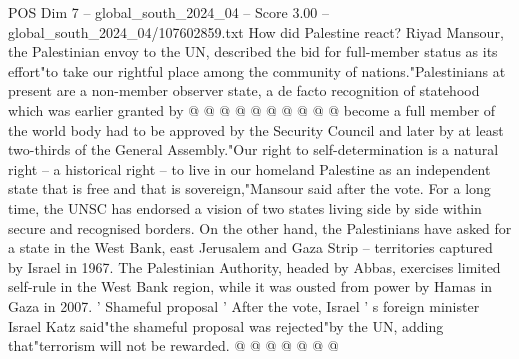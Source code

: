 \begin{textsample}{POS Dim 7 – global\_south\_2024\_04 – Score 3.00 – global\_south\_2024\_04/107602859.txt}
How did Palestine react?
Riyad Mansour, the Palestinian envoy to the UN, described the bid for full-member status as its effort"to take our rightful place among the community of nations."Palestinians at present are a non-member observer state, a de facto recognition of statehood which was earlier granted by @ @ @ @ @ @ @ @ @ @ become a full member of the world body had to be approved by the Security Council and later by at least two-thirds of the General Assembly."Our right to self-determination is a natural right -- a historical right -- to live in our homeland Palestine as an independent state that is free and that is sovereign,"Mansour said after the vote.
For a long time, the UNSC has endorsed a vision of two states living side by side within secure and recognised borders.
On the other hand, the Palestinians have asked for a state in the West Bank, east Jerusalem and Gaza Strip -- territories captured by Israel in 1967.
The Palestinian Authority, headed by Abbas, exercises limited self-rule in the West Bank region, while it was ousted from power by Hamas in Gaza in 2007. ' Shameful proposal ' After the vote, Israel ' s foreign minister Israel Katz said"the shameful proposal was rejected"by the UN, adding that"terrorism will not be rewarded. @ @ @ @ @ @ @

\end{textsample}

